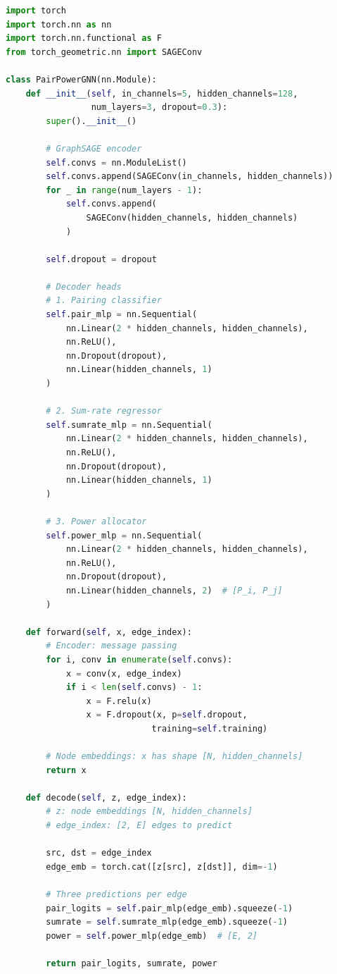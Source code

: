 \begin{lstlisting}[language=Python, caption={Multi-Task GraphSAGE Model}]
import torch
import torch.nn as nn
import torch.nn.functional as F
from torch_geometric.nn import SAGEConv

class PairPowerGNN(nn.Module):
    def __init__(self, in_channels=5, hidden_channels=128, 
                 num_layers=3, dropout=0.3):
        super().__init__()
        
        # GraphSAGE encoder
        self.convs = nn.ModuleList()
        self.convs.append(SAGEConv(in_channels, hidden_channels))
        for _ in range(num_layers - 1):
            self.convs.append(
                SAGEConv(hidden_channels, hidden_channels)
            )
        
        self.dropout = dropout
        
        # Decoder heads
        # 1. Pairing classifier
        self.pair_mlp = nn.Sequential(
            nn.Linear(2 * hidden_channels, hidden_channels),
            nn.ReLU(),
            nn.Dropout(dropout),
            nn.Linear(hidden_channels, 1)
        )
        
        # 2. Sum-rate regressor
        self.sumrate_mlp = nn.Sequential(
            nn.Linear(2 * hidden_channels, hidden_channels),
            nn.ReLU(),
            nn.Dropout(dropout),
            nn.Linear(hidden_channels, 1)
        )
        
        # 3. Power allocator
        self.power_mlp = nn.Sequential(
            nn.Linear(2 * hidden_channels, hidden_channels),
            nn.ReLU(),
            nn.Dropout(dropout),
            nn.Linear(hidden_channels, 2)  # [P_i, P_j]
        )
    
    def forward(self, x, edge_index):
        # Encoder: message passing
        for i, conv in enumerate(self.convs):
            x = conv(x, edge_index)
            if i < len(self.convs) - 1:
                x = F.relu(x)
                x = F.dropout(x, p=self.dropout, 
                             training=self.training)
        
        # Node embeddings: x has shape [N, hidden_channels]
        return x
    
    def decode(self, z, edge_index):
        # z: node embeddings [N, hidden_channels]
        # edge_index: [2, E] edges to predict
        
        src, dst = edge_index
        edge_emb = torch.cat([z[src], z[dst]], dim=-1)
        
        # Three predictions per edge
        pair_logits = self.pair_mlp(edge_emb).squeeze(-1)
        sumrate = self.sumrate_mlp(edge_emb).squeeze(-1)
        power = self.power_mlp(edge_emb)  # [E, 2]
        
        return pair_logits, sumrate, power
\end{lstlisting}

